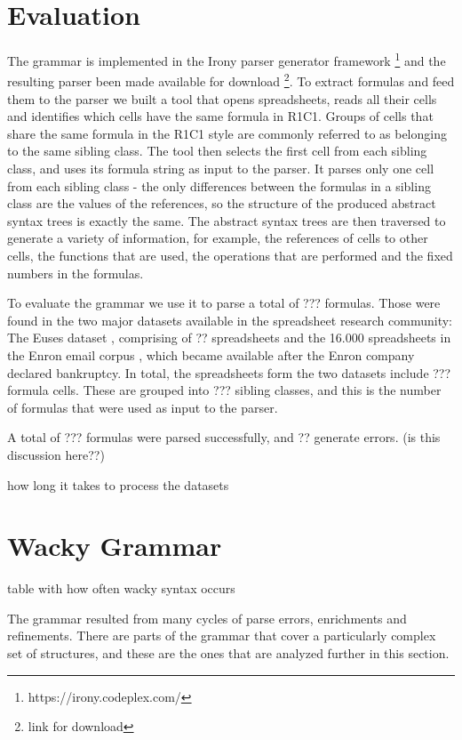 \documentclass[conference]{IEEEtran}
\begin{document}
\section{Evaluation}
The grammar is implemented in the Irony parser generator framework \footnote{https://irony.codeplex.com/} and the resulting parser been made available for download \footnote{link for download}. To extract formulas and feed them to the parser we built a tool that opens spreadsheets, reads all their cells and identifies which cells have the same formula in R1C1. Groups of cells that share the same formula in the R1C1 style are commonly referred to as belonging to the same sibling class. The tool then selects the first cell from each sibling class, and uses its formula string as input to the parser. It parses only one cell from each sibling class - the only differences between the formulas in a sibling class are the values of the references, so the structure of the produced abstract syntax trees is exactly the same. The abstract syntax trees are then traversed to generate a variety of information, for example, the references of cells to other cells, the functions that are used, the operations that are performed and the fixed numbers in the formulas.

To evaluate the grammar we use it to parse a total of ??? formulas. Those were found in the two major datasets available in the spreadsheet research community: The Euses dataset \cite{euses}, comprising of ?? spreadsheets and the 16.000 spreadsheets in the Enron email corpus \cite{enron}, which became available after the Enron company declared bankruptcy. In total, the spreadsheets form the two datasets include ??? formula cells. These are grouped into ??? sibling classes, and this is the number of formulas that were used as input to the parser.

A total of ??? formulas were parsed successfully, and ?? generate errors. (is this discussion here??)

how long it takes to process the datasets

\section{Wacky Grammar}
table with how often wacky syntax occurs

The grammar resulted from many cycles of parse errors, enrichments and refinements. There are parts of the grammar that cover a particularly complex set of structures, and these are the ones that are analyzed further in this section.
\end{document}
